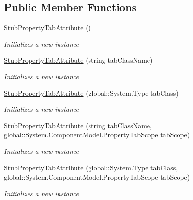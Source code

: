 \subsection*{Public Member Functions}
\begin{DoxyCompactItemize}
\item 
\hyperlink{class_system_1_1_component_model_1_1_fakes_1_1_stub_property_tab_attribute_a8d75a9fd5e6a03da6def4c18e349cea3}{Stub\-Property\-Tab\-Attribute} ()
\begin{DoxyCompactList}\small\item\em Initializes a new instance\end{DoxyCompactList}\item 
\hyperlink{class_system_1_1_component_model_1_1_fakes_1_1_stub_property_tab_attribute_aef301a92f5b376a3b9427c9db2d4d414}{Stub\-Property\-Tab\-Attribute} (string tab\-Class\-Name)
\begin{DoxyCompactList}\small\item\em Initializes a new instance\end{DoxyCompactList}\item 
\hyperlink{class_system_1_1_component_model_1_1_fakes_1_1_stub_property_tab_attribute_afafa4a387a15b604bdc13b6d7a85d0db}{Stub\-Property\-Tab\-Attribute} (global\-::\-System.\-Type tab\-Class)
\begin{DoxyCompactList}\small\item\em Initializes a new instance\end{DoxyCompactList}\item 
\hyperlink{class_system_1_1_component_model_1_1_fakes_1_1_stub_property_tab_attribute_a8d17069b7d896cba0ccf6104563e0952}{Stub\-Property\-Tab\-Attribute} (string tab\-Class\-Name, global\-::\-System.\-Component\-Model.\-Property\-Tab\-Scope tab\-Scope)
\begin{DoxyCompactList}\small\item\em Initializes a new instance\end{DoxyCompactList}\item 
\hyperlink{class_system_1_1_component_model_1_1_fakes_1_1_stub_property_tab_attribute_a1fe44d1fc85e6dc6ed76a851eb27d3b3}{Stub\-Property\-Tab\-Attribute} (global\-::\-System.\-Type tab\-Class, global\-::\-System.\-Component\-Model.\-Property\-Tab\-Scope tab\-Scope)
\begin{DoxyCompactList}\small\item\em Initializes a new instance\end{DoxyCompactList}\item 

\end{DoxyCompactItemize}
